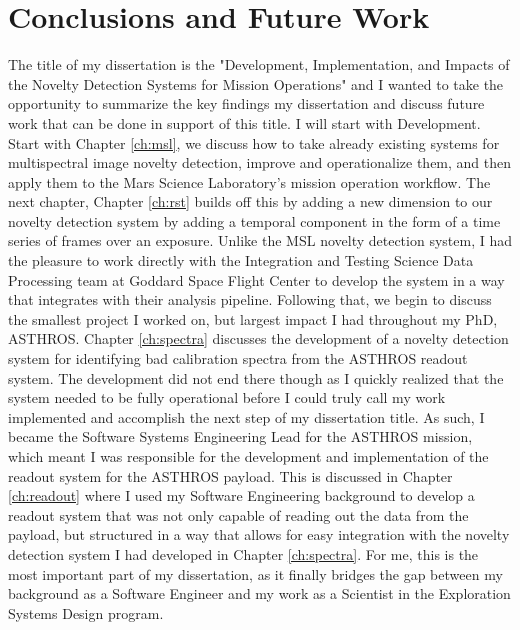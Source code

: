 \chapter{Conclusions and Future Work}
\label{ch:conclusion}
The title of my dissertation is the "Development, Implementation, and Impacts of the Novelty Detection Systems for Mission Operations" and I wanted to take the opportunity to summarize the key findings my dissertation and discuss future work that can be done in support of this title. 
I will start with Development. 
Start with Chapter \ref{ch:msl}, we discuss how to take already existing systems for multispectral image novelty detection, improve and operationalize them, and then apply them to the Mars Science Laboratory's mission operation workflow.
The next chapter, Chapter \ref{ch:rst} builds off this by adding a new dimension to our novelty detection system by adding a temporal component in the form of a time series of frames over an exposure.
Unlike the MSL novelty detection system, I had the pleasure to work directly with the Integration and Testing Science Data Processing team at Goddard Space Flight Center to develop the system in a way that integrates with their analysis pipeline.
Following that, we begin to discuss the smallest project I worked on, but largest impact I had throughout my PhD, ASTHROS. 
Chapter \ref{ch:spectra} discusses the development of a novelty detection system for identifying bad calibration spectra from the ASTHROS readout system.
The development did not end there though as I quickly realized that the system needed to be fully operational before I could truly call my work implemented and accomplish the next step of my dissertation title.
As such, I became the Software Systems Engineering Lead for the ASTHROS mission, which meant I was responsible for the development and implementation of the readout system for the ASTHROS payload.
This is discussed in Chapter \ref{ch:readout} where I used my Software Engineering background to develop a readout system that was not only capable of reading out the data from the payload, but structured in a way that allows for easy integration with the novelty detection system I had developed in Chapter \ref{ch:spectra}.
For me, this is the most important part of my dissertation, as it finally bridges the gap between my background as a Software Engineer and my work as a Scientist in the Exploration Systems Design program.

